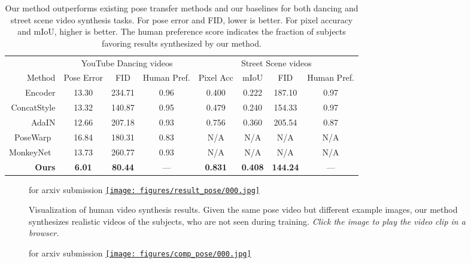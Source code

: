 \documentclass{article}
\def\arxiv{for arxiv submission}
\newcommand{\acrobat}{\emph{Click the image to play the video clip in a browser.}}
\newcommand{\acrobat}{\emph{The figure is best viewed with Acrobat Reader. Click the image to play the video clip.}}
\begin{document}
\begin{table}[tb!]
\centering
	\small
    \begin{tabular}{r||c|c||c |c|c|c||c}
& \multicolumn{3}{c}{YouTube Dancing videos}  & \multicolumn{4}{|c}{Street Scene videos}  \\
\cline{2-8}
Method & Pose Error & FID & Human Pref. & Pixel Acc & mIoU & FID & Human Pref. \\
\Xhline{2\arrayrulewidth}
Encoder & 13.30 & 234.71 & 0.96 & 0.400 & 0.222 & 187.10 & 0.97 \\
ConcatStyle  & 13.32 & 140.87 & 0.95 & 0.479 & 0.240 & 154.33 & 0.97 \\
AdaIN  & 12.66 & 207.18 & 0.93 & 0.756 & 0.360 & 205.54 & 0.87 \\
PoseWarp~\cite{balakrishnan2018synthesizing}  & 16.84 & 180.31 & 0.83 & N/A & N/A & N/A & N/A \\
MonkeyNet~\cite{Siarohin2019monkeynet}  & 13.73 & 260.77 & 0.93 & N/A & N/A & N/A & N/A\\
{\bf Ours } & {\bf 6.01} & {\bf 80.44} & --- & {\bf 0.831} & {\bf 0.408} & {\bf 144.24} & ---\\
	\end{tabular}
	\caption{Our method outperforms existing pose transfer methods and our baselines for both dancing and street scene video synthesis tasks. For pose error and FID, lower is better. For pixel accuracy and mIoU, higher is better. The human preference score indicates the fraction of subjects favoring results synthesized by our method.}
	\label{tbl::comp}
	\vspace{-4mm}
 \end{table} \begin{figure}[t!]
 \centering
 \ifdefined\arxiv
 \href{https://nvlabs.github.io/few-shot-vid2vid/web_gifs/dance.gif}{\texttt{[image: figures/result\_pose/000.jpg]}}
 \else
 \fi
  \caption{Visualization of human video synthesis results. Given the same pose video but different example images, our method synthesizes realistic videos of the subjects, who are not seen during training. \acrobat}
 \label{fig::result_pose}
 \vspace{-3mm}
\end{figure} \begin{figure}[t!]
 \centering
 \ifdefined\arxiv
 \href{https://nvlabs.github.io/few-shot-vid2vid/web_gifs/comp_pose.mp4}{\texttt{[image: figures/comp\_pose/000.jpg]}}
 \else

\end{figure}
\end{document}
